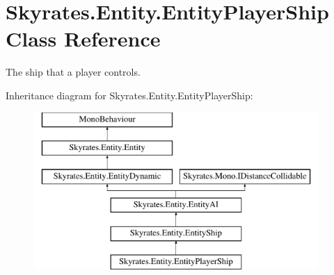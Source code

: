 \hypertarget{class_skyrates_1_1_entity_1_1_entity_player_ship}{\section{Skyrates.\-Entity.\-Entity\-Player\-Ship Class Reference}
\label{class_skyrates_1_1_entity_1_1_entity_player_ship}
}


The ship that a player controls.  


Inheritance diagram for Skyrates.\-Entity.\-Entity\-Player\-Ship\-:\begin{figure}[H]
\begin{center}
\leavevmode
\includegraphics[height=6.000000cm]{class_skyrates_1_1_entity_1_1_entity_player_ship}
\end{center}
\end{figure}
